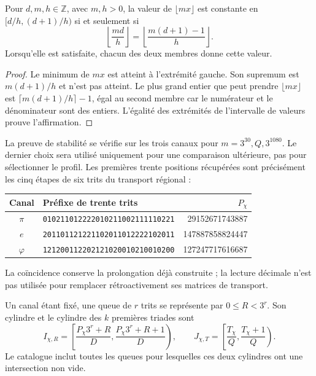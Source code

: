 \begin{lemma}
\label{act21:censo:estabilidad}
Pour \(d,m,h\in\mathbb Z\), avec \(m,h>0\), la valeur de
\(\lfloor mx\rfloor\) est constante en \([d/h,(d+1)/h)\) si et seulement si
\begin{equation}
 \left\lfloor\frac{md}{h}\right\rfloor
 =\left\lfloor\frac{m(d+1)-1}{h}\right\rfloor.
 \label{act21:censo:prueba-estabilidad}
\end{equation}
Lorsqu'elle est satisfaite, chacun des deux membres donne cette valeur.
\end{lemma}
\begin{proof}
Le minimum de \(mx\) est atteint à l'extrémité gauche. Son supremum
est \(m(d+1)/h\) et n'est pas atteint. Le plus grand entier que peut prendre
\(\lfloor mx\rfloor\) est
\(\lceil m(d+1)/h\rceil-1\), égal au second membre car
le numérateur et le dénominateur sont des entiers. L'égalité des extrémités
de l'intervalle de valeurs prouve l'affirmation.
\end{proof}

La preuve de stabilité se vérifie sur les trois canaux pour
\(m=3^{30},Q,3^{1080}\). Le dernier choix sera utilisé uniquement
pour une comparaison ultérieure, pas pour sélectionner le profil. Les
premières trente positions récupérées sont précisément les cinq
étapes de six trits du transport régional :
\begin{center}\small
\begin{tabular}{@{}c l r@{}}\toprule
Canal&Préfixe de trente trits&\(P_\chi\)\\\midrule
\(\pi\)&\texttt{010211012222010211002111110221}&29152671743887\\
\(e\)&\texttt{201101121221102011012222102011}&147887858824447\\
\(\varphi\)&\texttt{121200112202121020010210010200}&127247717616687\\\bottomrule
\end{tabular}
\end{center}
La coïncidence conserve la prolongation déjà construite ; la lecture décimale
n'est pas utilisée pour remplacer rétroactivement ses matrices de transport.

Un canal étant fixé, une queue de \(r\) trits se représente par
\(0\leq R<3^r\). Son cylindre et le cylindre des \(k\) premières
triades sont
\begin{equation}
 I_{\chi,R}=\left[\frac{P_\chi3^r+R}{D},
                       \frac{P_\chi3^r+R+1}{D}\right),\qquad
 J_{\chi,T}=\left[\frac{T_\chi}{Q},\frac{T_\chi+1}{Q}\right).
 \label{act21:censo:dos-cilindros}
\end{equation}
Le catalogue inclut toutes les queues pour lesquelles ces deux cylindres
ont une intersection non vide.

